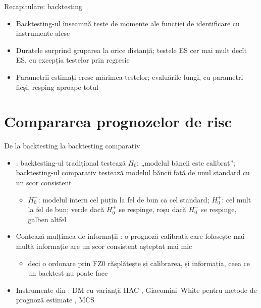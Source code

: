 \begin{frame}{Recapitulare: backtesting}
\itemsize{\small}
\begin{itemize}
    \item Backtesting-ul înseamnă teste de momente ale funcției de identificare cu instrumente alese
    \item Duratele surprind gruparea la orice distanță; testele ES cer mai mult decît ES, cu excepția testelor prin regresie
    \item Parametrii estimați cresc mărimea testelor; evaluările lungi, cu parametri ficși, resping aproape totul
\end{itemize}
\end{frame}


\section{Compararea prognozelor de risc}

\begin{frame}{De la backtesting la backtesting comparativ}
\itemsize{\small}
\begin{itemize}
    \item {}: backtesting-ul tradițional testează $H_0$: „modelul băncii este calibrat”; backtesting-ul comparativ testează modelul băncii față de unul standard cu un scor consistent
    \begin{itemize}
        \item $H_0^-$: modelul intern cel puțin la fel de bun ca cel standard; $H_0^+$: cel mult la fel de bun; verde dacă $H_0^+$ se respinge, roșu dacă $H_0^-$ se respinge, galben altfel
    \end{itemize}
    \item Contează mulțimea de informații : o prognoză calibrată care folosește mai multă informație are un scor consistent așteptat mai mic
    \begin{itemize}
        \item deci o ordonare prin FZ0 răsplătește și calibrarea, și informația, ceea ce un backtest nu poate face
    \end{itemize}
    \item Instrumente din : DM cu varianță HAC , Giacomini--White pentru metode de prognoză estimate , MCS 
\end{itemize}
\end{frame}

